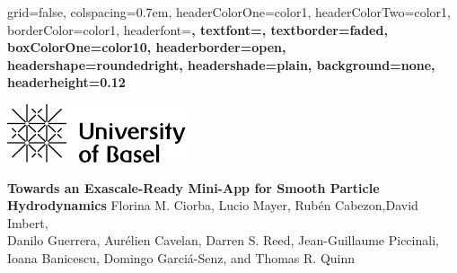 \documentclass[portrait,a0paper,fontscale=0.292]{baposter}
\begin{document}
\begin{poster}{
 grid=false,
 colspacing=0.7em,
 headerColorOne=color1,
 headerColorTwo=color1,
 borderColor=color1,
 headerfont=\Large\bf\textsf ,
 textfont=\sf,
 textborder=faded,
 boxColorOne=color10,
 headerborder=open,
 headershape=roundedright,
 headershade=plain,
 background=none,
 headerheight=0.12\textheight}
 {
	\parbox[t]{0.2\textwidth}{
	\vspace{-2.5\baselineskip}
 	\includegraphics[height=0.05\textheight]{logo}
 	}
 }
 {
	\sf\textbf{Towards an Exascale-Ready Mini-App for Smooth Particle Hydrodynamics}
 }
 {
 	\sf
 	\vspace{0.5\baselineskip}
 	Florina M. Ciorba, Lucio Mayer, Rubén Cabezon,David Imbert,\\
 	 Danilo Guerrera, Aurélien Cavelan, Darren S. Reed, Jean-Guillaume Piccinali,\\
 	 Ioana Banicescu, Domingo Garciá-Senz, and Thomas R. Quinn\\[1em]
 }
 {
 }



\end{poster}
\end{document}
